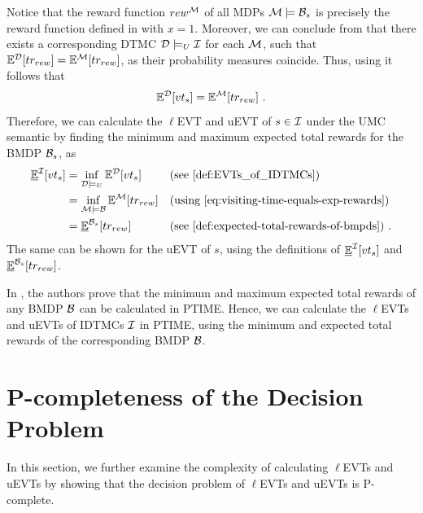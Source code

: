 Notice that the reward function $rew^{\mathcal{M}}$ of all MDPs $\mathcal{M} \models \mathcal{B}_{s}$ is precisely the reward function defined in  with $x = 1$. Moreover, we can conclude from  that there exists a corresponding DTMC $\mathcal{D} \models_U \mathcal{I}$ for each $\mathcal{M}$, such that $\mathbb{E}^{\mathcal{D}}[tr_{rew}] = \mathbb{E}^{\mathcal{M}}[tr_{rew}]$, as their probability measures coincide. Thus, using  it follows that
\begin{equation}\label{eq:visiting-time-equals-exp-rewards}
    \mathbb{E}^{\mathcal{D}}[vt_s] = \mathbb{E}^{\mathcal{M}}[tr_{rew}]\ .
\end{equation}
Therefore, we can calculate the $\ell$EVT and uEVT of $s\in \mathcal{I}$ under the UMC semantic by finding the minimum and maximum expected total rewards for the BMDP $\mathcal{B}_s$, as
\begin{align}
    \ExpLower^\IMC[vt_s] 
    & = \inf_{\MC\models_U}\Exp^\MC[vt_s] && \text{(see \Cref{def:EVTs_of_IDTMCs})}\notag\\
    & = \inf_{\MDP\models\BMDP} \Exp^\MDP[tr_{rew}] && \text{(using \Cref{eq:visiting-time-equals-exp-rewards})}\notag\\
    & = \ExpLower^{\BMDP_s}[tr_{rew}] && \text{(see \Cref{def:expected-total-rewards-of-bmpds})}\ .\notag
\end{align}
The same can be shown for the uEVT of $s$, using the definitions of $\mathbb{\underline{E}}^{\mathcal{I}}[vt_s]$ and $\mathbb{\underline{E}}^{\mathcal{B}_s}[tr_{rew}]$.

In \cite{Tewari_Bounded_Parameter_MDP}, the authors prove that the minimum and maximum expected total rewards of any BMDP $\mathcal{B}$ can be calculated in PTIME. Hence, we can calculate the $\ell$EVTs and uEVTs of IDTMCs $\mathcal{I}$ in PTIME, using the minimum and expected total rewards of the corresponding BMDP $\mathcal{B}$.




\section{P-completeness of the Decision Problem}\label{sec:P-completeness of the Decision Problem}
In this section, we further examine the complexity of calculating $\ell$EVTs and uEVTs by showing that the decision problem of $\ell$EVTs and uEVTs is P-complete.

